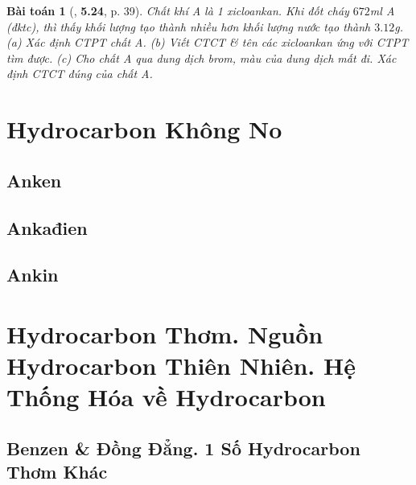 \documentclass{article}
\numberwithin{equation}{section}
\newtheorem{baitoan}{Bài toán}[section]
\begin{document}
\begin{baitoan}[\cite{SBT_Hoa_Hoc_11_co_ban}, \textbf{5.24}, p. 39]
	Chất khí A là 1 xicloankan. Khi đốt cháy $672$\emph{ml} A (đktc), thì thấy khối lượng \emph{} tạo thành nhiều hơn khối lượng nước tạo thành $3.12$\emph{g}. (a) Xác định CTPT chất A. (b) Viết CTCT \& tên các xicloankan ứng với CTPT tìm được. (c) Cho chất A qua dung dịch brom, màu của dung dịch mất đi. Xác định CTCT đúng của chất A.
\end{baitoan}


\section{Hydrocarbon Không No}

\subsection{Anken}


\subsection{Ankađien}


\subsection{Ankin}


\section{Hydrocarbon Thơm. Nguồn Hydrocarbon Thiên Nhiên. Hệ Thống Hóa về Hydrocarbon}

\subsection{Benzen \& Đồng Đẳng. 1 Số Hydrocarbon Thơm Khác}

\end{document}
